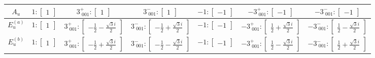 \documentclass[fleqn,8pt,landscape]{jsarticle}
\begin{document}
\begin{longtable}{ccccccc}
$ A_{u} $ & $ 1:\begin{bmatrix} 1 \end{bmatrix} $ & $ 3^{+}_{\,\,001}:\begin{bmatrix} 1 \end{bmatrix} $ & $ 3^{-}_{\,\,001}:\begin{bmatrix} 1 \end{bmatrix} $ & $ -1:\begin{bmatrix} -1 \end{bmatrix} $ & $ -3^{+}_{\,\,001}:\begin{bmatrix} -1 \end{bmatrix} $ & $ -3^{-}_{\,\,001}:\begin{bmatrix} -1 \end{bmatrix} $ \\ \hline
$ E_{u}^{(a)} $ & $ 1:\begin{bmatrix} 1 \end{bmatrix} $ & $ 3^{+}_{\,\,001}:\begin{bmatrix} - \frac{1}{2} - \frac{\sqrt{3} i}{2} \end{bmatrix} $ & $ 3^{-}_{\,\,001}:\begin{bmatrix} - \frac{1}{2} + \frac{\sqrt{3} i}{2} \end{bmatrix} $ & $ -1:\begin{bmatrix} -1 \end{bmatrix} $ & $ -3^{+}_{\,\,001}:\begin{bmatrix} \frac{1}{2} + \frac{\sqrt{3} i}{2} \end{bmatrix} $ & $ -3^{-}_{\,\,001}:\begin{bmatrix} \frac{1}{2} - \frac{\sqrt{3} i}{2} \end{bmatrix} $ \\ \hline
$ E_{u}^{(b)} $ & $ 1:\begin{bmatrix} 1 \end{bmatrix} $ & $ 3^{+}_{\,\,001}:\begin{bmatrix} - \frac{1}{2} + \frac{\sqrt{3} i}{2} \end{bmatrix} $ & $ 3^{-}_{\,\,001}:\begin{bmatrix} - \frac{1}{2} - \frac{\sqrt{3} i}{2} \end{bmatrix} $ & $ -1:\begin{bmatrix} -1 \end{bmatrix} $ & $ -3^{+}_{\,\,001}:\begin{bmatrix} \frac{1}{2} - \frac{\sqrt{3} i}{2} \end{bmatrix} $ & $ -3^{-}_{\,\,001}:\begin{bmatrix} \frac{1}{2} + \frac{\sqrt{3} i}{2} \end{bmatrix} $ \\
\end{longtable}
\end{document}
